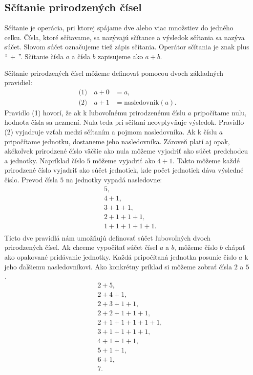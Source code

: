 \documentclass{report}
\begin{document}
\subsection{Sčítanie prirodzených čísel}

Sčítanie je operácia, pri ktorej spájame dve alebo viac množstiev do jedného celku. Čísla, ktoré sčítavame, sa nazývajú sčítance a výsledok sčítania sa nazýva súčet. Slovom súčet označujeme tiež zápis sčítania. Operátor sčítania je znak plus \enquote{\(\, + \,\)}. Sčítanie čísla \(a\) a čísla \(b\) zapisujeme ako \(a + b\).

Sčítanie prirodzených čísel môžeme definovať pomocou dvoch základných pravidiel:
\[
\begin{aligned}
  \text{(1)}\quad a + 0 &= a, \\
  \text{(2)}\quad a + 1 &= \text{nasledovník}(a).
\end{aligned}
\]
Pravidlo (1) hovorí, že ak k ľubovoľnému prirodzenému číslu \(a\) pripočítame nulu, hodnota čísla sa nezmení. Nula teda pri sčítaní neovplyvňuje výsledok. Pravidlo (2) vyjadruje vzťah medzi sčítaním a pojmom nasledovníka. Ak k číslu \(a\) pripočítame jednotku, dostaneme jeho nasledovníka. Zároveň platí aj opak, akékoľvek prirodzené číslo väčšie ako nula môžeme vyjadriť ako súčet predchodcu a jednotky. Napríklad číslo \(5\) môžeme vyjadriť ako \(4 + 1\). Takto môžeme každé prirodzené číslo vyjadriť ako súčet jednotiek, kde počet jednotiek dáva výsledné číslo. Prevod čísla \(5\) na jednotky vypadá nasledovne:
\[
\begin{aligned}
  &5, \\
  &4 + 1, \\
  &3 + 1 + 1, \\
  &2 + 1 + 1 + 1, \\
  &1 + 1 + 1 + 1 + 1. \\
\end{aligned}
\]
Tieto dve pravidlá nám umožňujú definovať súčet ľubovoľných dvoch prirodzených čísel. Ak chceme vypočítať súčet čísel \(a\) a \(b\), môžeme číslo \(b\) chápať ako opakované pridávanie jednotky. Každá pripočítaná jednotka posunie číslo \(a\) k jeho ďalšiemu nasledovníkovi. Ako konkrétny príklad si môžeme zobrať čísla \(2\) a \(5\).
\[
\begin{aligned}
  &2 + 5, \\
  &2 + 4 + 1, \\
  &2 + 3 + 1 + 1, \\
  &2 + 2 + 1 + 1 + 1, \\
  &2 + 1 + 1 + 1 + 1 + 1, \\
  &3 + 1 + 1 + 1 + 1, \\
  &4 + 1 + 1 + 1, \\
  &5 + 1 + 1, \\
  &6 + 1, \\
  &7.
\end{aligned}
\]
\end{document}
